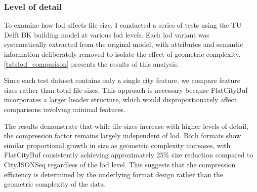 \subsubsection{Level of detail}
\label{result:overview:analysis_of_file_size_results:level_of_detail}

To examine how \ac{lod} affects file size, I conducted a series of tests using the TU Delft BK building model at various \ac{lod} levels. Each \ac{lod} variant was systematically extracted from the original model, with attributes and semantic information deliberately removed to isolate the effect of geometric complexity. \autoref{tab:lod_comparison} presents the results of this analysis.

Since each test dataset contains only a single city feature, we compare feature sizes rather than total file sizes. This approach is necessary because FlatCityBuf incorporates a larger header structure, which would disproportionately affect comparisons involving minimal features.

The results demonstrate that while file sizes increase with higher levels of detail, the compression factor remains largely independent of \ac{lod}. Both formats show similar proportional growth in size as geometric complexity increases, with FlatCityBuf consistently achieving approximately 25\% size reduction compared to CityJSONSeq regardless of the \ac{lod} level. This suggests that the compression efficiency is determined by the underlying format design rather than the geometric complexity of the data.

